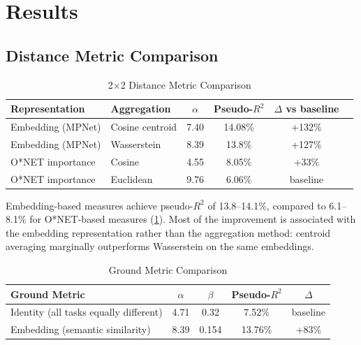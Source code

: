 \documentclass[12pt]{article}
\begin{document}
\section{Results}
\label{sec:results}


\subsection{Distance Metric Comparison}
\label{subsec:geometry-comparison}


\begin{table}[h!]
\centering
\caption{2$\times$2 Distance Metric Comparison}
\label{tab:2x2-comparison}
\begin{tabular}{llcccc}
\toprule
\textbf{Representation} & \textbf{Aggregation} & $\alpha$ & Pseudo-$R^2$ & $\Delta$ vs baseline \\
\midrule
Embedding (MPNet) & Cosine centroid & 7.40 & 14.08\% & +132\% \\
Embedding (MPNet) & Wasserstein & 8.39 & 13.8\% & +127\% \\
O*NET importance & Cosine & 4.55 & 8.05\% & +33\% \\
O*NET importance & Euclidean & 9.76 & 6.06\% & baseline \\
\bottomrule
\end{tabular}
\end{table}


Embedding-based measures achieve pseudo-$R^2$ of 13.8--14.1\%, compared to 6.1--8.1\% for O*NET-based measures (\cref{tab:2x2-comparison}). Most of the improvement is associated with the embedding representation rather than the aggregation method: centroid averaging marginally outperforms Wasserstein on the same embeddings.


\begin{table}[h!]
\centering
\caption{Ground Metric Comparison}
\label{tab:ground-metric}
\begin{tabular}{lcccc}
\toprule
\textbf{Ground Metric} & $\alpha$ & $\beta$ & Pseudo-$R^2$ & $\Delta$ \\
\midrule
Identity (all tasks equally different) & 4.71 & 0.32 & 7.52\% & baseline \\
Embedding (semantic similarity) & 8.39 & 0.154 & 13.76\% & +83\% \\
\bottomrule
\end{tabular}
\end{table}
\end{document}
